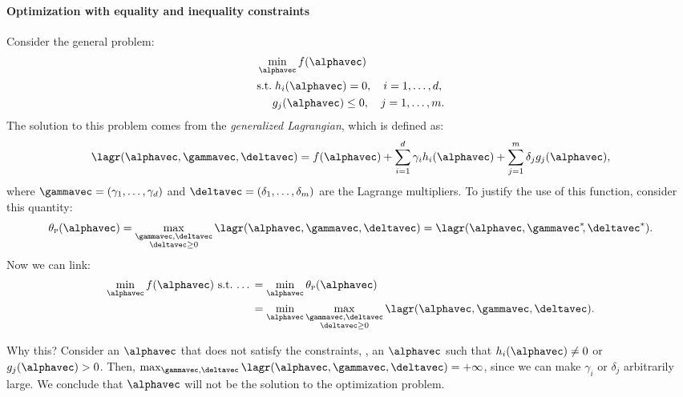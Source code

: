 \paragraph{Optimization with equality and inequality constraints} Consider the general problem:
\begin{equation}
    \begin{aligned}
         & \min_{\alphavec} f(\alphavec)                                \\
         & \text{s.t.}\; h_i(\alphavec) = 0, \quad i = 1, \dots, d,     \\
         & \phantom{s.t.} g_j(\alphavec) \leq 0, \quad j = 1, \dots, m.
    \end{aligned}
\end{equation}
The solution to this problem comes from the \emph{generalized Lagrangian}, which is defined as:
\begin{equation}
    \lagr(\alphavec, \gammavec, \deltavec) = f(\alphavec) + \sum_{i=1}^d \gamma_i h_i(\alphavec) + \sum_{j=1}^m \delta_j g_j(\alphavec),
\end{equation}
where $\gammavec = (\gamma_1, \dots, \gamma_d)$ and $\deltavec = (\delta_1, \dots, \delta_m)$ are the Lagrange multipliers. To justify the use of this function, consider this quantity:
\begin{equation}
    \theta_{\textsc{p}}(\alphavec) = \max_{\substack{\gammavec, \deltavec\\\deltavec \geq 0}}\lagr(\alphavec, \gammavec, \deltavec) = \lagr(\alphavec, \gammavec^*\negmedspace, \deltavec^*).
\end{equation}
Now we can link:
\begin{equation}
    \begin{aligned}
        \min_{\alphavec} f(\alphavec) \text{ s.t.}\,\ldots\, & = \min_{\alphavec} \theta_{\textsc{p}}(\alphavec)         \\
                                      & = \min_{\alphavec} \max_{\substack{\gammavec, \deltavec \\\deltavec \geq 0}} \lagr(\alphavec, \gammavec, \deltavec).
    \end{aligned}
\end{equation}

\begin{note}
    Why this? Consider an $\alphavec$ that does not satisfy the constraints, \ie, an $\alphavec$ such that $h_i(\alphavec) \neq 0$ or $g_j(\alphavec) > 0$. Then, $\max_{\gammavec, \deltavec} \lagr(\alphavec, \gammavec, \deltavec) = +\infty$, since we can make $\gamma_i$ or $\delta_j$ arbitrarily large. We conclude that $\alphavec$ will not be the solution to the optimization problem.
\end{note}

